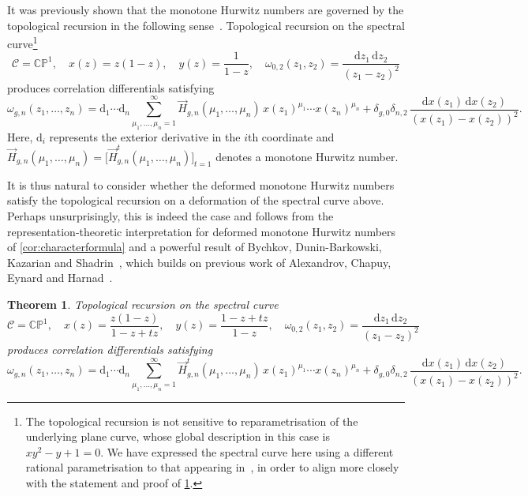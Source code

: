 \documentclass[a4paper]{article}
\theoremstyle{plain}
\newtheorem{theorem}{Theorem}
\numberwithin{theorem}{section}
\theoremstyle{definition}
\theoremstyle{remark}
\newcommand{\dd}{\mathrm{d}}
\newcommand{\HN}[3]{\vec{H}^t_{#1,#2}(#3)}
\begin{document}
It was previously shown that the monotone Hurwitz numbers are governed by the topological recursion in the following sense~\cite{do-dye-mat17}. Topological recursion on the spectral curve\footnote{The topological recursion is not sensitive to reparametrisation of the underlying plane curve, whose global description in this case is $xy^2 - y + 1 = 0$. We have expressed the spectral curve here using a different rational parametrisation to that appearing in~\cite{do-dye-mat17}, in order to align more closely with the statement and proof of \cref{thm:TR}.}
\[
\mathcal{C} = \mathbb{CP}^1, \quad x(z) = z(1 - z), \quad y(z) = \frac{1}{1 - z}, \quad \omega_{0,2}(z_1, z_2) = \frac{\dd z_1 \, \dd z_2}{(z_1 - z_2)^2}
\]
produces correlation differentials satisfying
\[
\omega_{g,n}(z_1, \ldots, z_n) = \dd_1 \cdots \dd_n \sum_{\mu_1, \ldots, \mu_n=1}^{\infty} \vec{H}_{g,n}(\mu_1, \ldots, \mu_n) \, x(z_1)^{\mu_1} \cdots x(z_n)^{\mu_n} + \delta_{g,0} \delta_{n,2} \, \frac{\dd x(z_1) \, \dd x(z_2)}{\left( x(z_1) - x(z_2) \right)^2}.
\]
Here, $\dd_i$ represents the exterior derivative in the $i$th coordinate and $\vec{H}_{g,n}(\mu_1, \ldots, \mu_n) = \big[ \HN{g}{n}{\mu_1, \ldots, \mu_n} \big]_{t=1}$ denotes a monotone Hurwitz number.
 
 
It is thus natural to consider whether the deformed monotone Hurwitz numbers satisfy the topological recursion on a deformation of the spectral curve above. Perhaps unsurprisingly, this is indeed the case and follows from the representation-theoretic interpretation for deformed monotone Hurwitz numbers of \cref{cor:characterformula} and a powerful result of Bychkov, Dunin-Barkowski, Kazarian and Shadrin~\cite{BDKS21}, which builds on previous work of Alexandrov, Chapuy, Eynard and Harnad~\cite{ACEH20}.


\begin{theorem} \label{thm:TR}
Topological recursion on the spectral curve
\[
\mathcal{C} = \mathbb{CP}^1, \quad x(z) = \frac{z(1 - z)}{1-z+tz}, \quad y(z) = \frac{1-z+tz}{1 - z}, \quad \omega_{0,2}(z_1, z_2) = \frac{\dd z_1 \, \dd z_2}{(z_1 - z_2)^2}
\]
produces correlation differentials satisfying
\[
\omega_{g,n}(z_1, \ldots, z_n) = \dd_1 \cdots \dd_n \sum_{\mu_1, \ldots, \mu_n=1}^{\infty} \HN{g}{n}{\mu_1, \ldots, \mu_n} \, x(z_1)^{\mu_1} \cdots x(z_n)^{\mu_n} + \delta_{g,0} \delta_{n,2} \, \frac{\dd x(z_1) \, \dd x(z_2)}{\left( x(z_1) - x(z_2) \right)^2}.
\]
\end{theorem}
\end{document}
